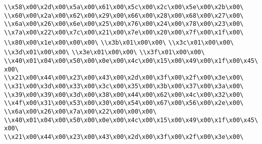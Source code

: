 \verb|\\x58\x00\x2d\x00\x5a\x00\x61\x00\x5c\x00\x2c\x00\x5e\x00\x2b\x00\|\newline
\verb|\\x60\x00\x2a\x00\x62\x00\x29\x00\x66\x00\x28\x00\x68\x00\x27\x00\|\newline
\verb|\\x6a\x00\x26\x00\x6e\x00\x25\x00\x76\x00\x24\x00\x78\x00\x23\x00\|\newline
\verb|\\x7a\x00\x22\x00\x7c\x00\x21\x00\x7e\x00\x20\x00\x7f\x00\x1f\x00\|\newline
\verb|\\x80\x00\x1e\x00\x00\x00\|\newline
\verb|\\x3b\x01\x00\x00\|\newline
\verb|\\x3c\x01\x00\x00\|\newline
\verb|\\x3d\x01\x00\x00\|\newline
\verb|\\x3e\x01\x00\x00\|\newline
\verb|\\x3f\x01\x00\x00\|\newline
\verb|\\x40\x01\x04\x00\x50\x00\x0e\x00\x4c\x00\x15\x00\x49\x00\x1f\x00\x45\x00\|\newline
\verb|\\x21\x00\x44\x00\x23\x00\x43\x00\x2d\x00\x3f\x00\x2f\x00\x3e\x00\|\newline
\verb|\\x31\x00\x3d\x00\x33\x00\x3c\x00\x35\x00\x3b\x00\x37\x00\x3a\x00\|\newline
\verb|\\x39\x00\x39\x00\x3d\x00\x38\x00\x44\x00\x62\x00\x4c\x00\x32\x00\|\newline
\verb|\\x4f\x00\x31\x00\x53\x00\x30\x00\x54\x00\x67\x00\x56\x00\x2e\x00\|\newline
\verb|\\x6a\x00\x26\x00\x7a\x00\x22\x00\x00\x00\|\newline
\verb|\\x40\x01\x04\x00\x50\x00\x0e\x00\x4c\x00\x15\x00\x49\x00\x1f\x00\x45\x00\|\newline
\verb|\\x21\x00\x44\x00\x23\x00\x43\x00\x2d\x00\x3f\x00\x2f\x00\x3e\x00\|\newline
